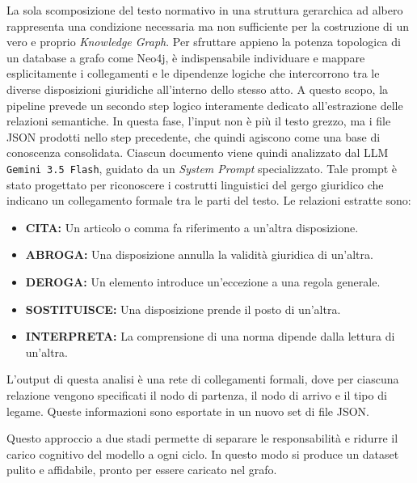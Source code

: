 La sola scomposizione del testo normativo in una struttura gerarchica ad albero rappresenta una condizione necessaria ma non sufficiente per la costruzione di un vero e proprio \textit{Knowledge Graph}. Per sfruttare appieno la potenza topologica di un database a grafo come Neo4j, è indispensabile individuare e mappare esplicitamente i collegamenti e le dipendenze logiche che intercorrono tra le diverse disposizioni giuridiche all'interno dello stesso atto. A questo scopo, la pipeline prevede un secondo step logico interamente dedicato all'estrazione delle relazioni semantiche.
In questa fase, l'input non è più il testo grezzo, ma i file JSON prodotti nello step precedente, che quindi agiscono come una base di conoscenza consolidata. Ciascun documento viene quindi analizzato dal LLM \texttt{Gemini 3.5 Flash}, guidato da un \textit{System Prompt} specializzato. Tale prompt è stato progettato per riconoscere i costrutti linguistici del gergo giuridico che indicano un collegamento formale tra le parti del testo. Le relazioni estratte sono:
\begin{itemize}
    \item \textbf{CITA:} Un articolo o comma fa riferimento a un'altra disposizione.
    \item \textbf{ABROGA:} Una disposizione annulla la validità giuridica di un'altra.
    \item \textbf{DEROGA:} Un elemento introduce un'eccezione a una regola generale.
    \item \textbf{SOSTITUISCE:} Una disposizione prende il posto di un'altra.
    \item \textbf{INTERPRETA:} La comprensione di una norma dipende dalla lettura di un'altra.
\end{itemize}

L'output di questa analisi è una rete di collegamenti formali, dove per ciascuna relazione vengono specificati il nodo di partenza, il nodo di arrivo e il tipo di legame. Queste informazioni sono esportate in un nuovo set di file JSON.

Questo approccio a due stadi permette di separare le responsabilità e ridurre il carico cognitivo del modello a ogni ciclo. In questo modo si produce un dataset pulito e affidabile, pronto per essere caricato nel grafo.